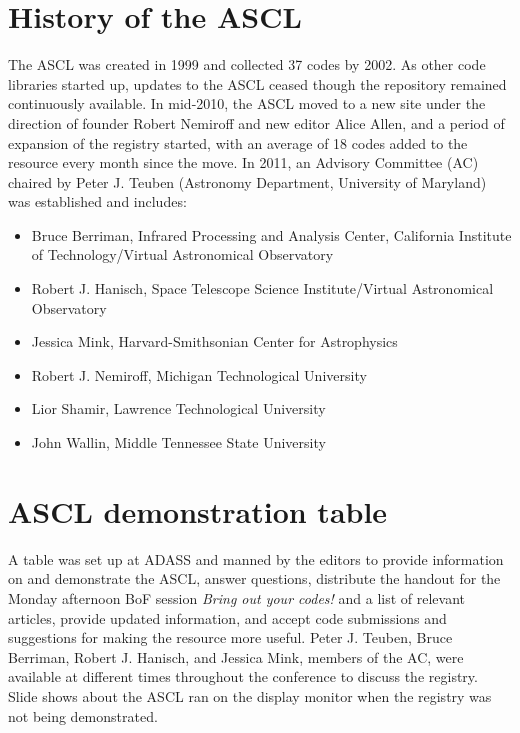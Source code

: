 \documentclass[11pt,twoside]{article}
\begin{document}
\section{History of the ASCL}

The ASCL was created in 1999 and collected 37 codes by 2002. As other code libraries started up, updates to the ASCL ceased though the repository remained continuously available. In mid-2010, the ASCL moved to a new site under the direction of founder Robert Nemiroff and new editor Alice Allen, and a period of expansion of the registry started, with an average of 18 codes added to the resource every month since the move. In 2011, an Advisory Committee (AC) chaired by Peter J. Teuben (Astronomy Department, University of Maryland) was established and includes: 
\begin{itemize}
\item Bruce Berriman, Infrared Processing and Analysis Center, California Institute of Technology/Virtual Astronomical Observatory
\item Robert J. Hanisch, Space Telescope Science Institute/Virtual Astronomical Observatory
\item Jessica Mink, Harvard-Smithsonian Center for Astrophysics
\item Robert J. Nemiroff, Michigan Technological University
\item Lior Shamir, Lawrence Technological University
\item John Wallin, Middle Tennessee State University
\end{itemize}

\section{ASCL demonstration table}

A table was set up at ADASS and manned by the editors to provide information on and demonstrate the ASCL, answer questions, distribute the handout for the Monday afternoon BoF session {\em Bring out your codes!} and a list of relevant articles, provide updated information, and accept code submissions and suggestions for making the resource more useful. Peter J. Teuben,  Bruce Berriman, Robert J. Hanisch, and Jessica Mink, members of the AC, were available at different times throughout the conference to discuss the registry. Slide shows about the ASCL ran on the display monitor when the registry was not being demonstrated.
\end{document}
